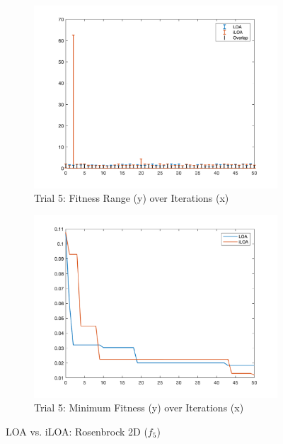 \begin{figure}
  \begin{subfigure}[b]{0.4\textwidth}
    \includegraphics[width=\textwidth]{img/bars/f5/5}
    \caption{ \scriptsize Trial 5: Fitness Range (y) over Iterations (x)}
    \label{fig:f5-b-5}
  \end{subfigure}
  \begin{subfigure}[b]{0.4\textwidth}
    \includegraphics[width=\textwidth]{img/fits/f5/5}
    \caption{ \scriptsize Trial 5: Minimum Fitness (y) over Iterations (x)}
    \label{fig:f5-f-5}
  \end{subfigure}

  \caption{ \scriptsize LOA vs. iLOA: Rosenbrock 2D ($f_5$)}
\end{figure}
